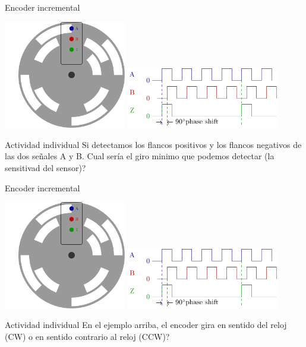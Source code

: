 \documentclass[presentation,aspectratio=169]{beamer}
\begin{document}
\begin{frame}[label={sec:orgb4ba6bb}]{Encoder incremental}
\begin{center}
\includegraphics[width=0.4\textwidth]{../../figures/encoder-disc}
\includegraphics[width=0.5\textwidth]{../../figures/encoder-signals}
\end{center}

\alert{Actividad individual} Si detectamos los flancos positivos \alert{y} los flancos negativos de las dos señales \textcolor{blue!80!black}{A} y \textcolor{red!80!black}{B}. Cual sería el giro minimo que podemos detectar (la sensitivad del sensor)?
\end{frame}


\begin{frame}[label={sec:org5d46de0}]{Encoder incremental}
\begin{center}
\includegraphics[width=0.4\textwidth]{../../figures/encoder-disc}
\includegraphics[width=0.5\textwidth]{../../figures/encoder-signals}
\end{center}

\alert{Actividad individual} En el ejemplo arriba, el encoder gira en sentido del reloj (CW) o en sentido contrario al reloj (CCW)?
\end{frame}
\end{document}
